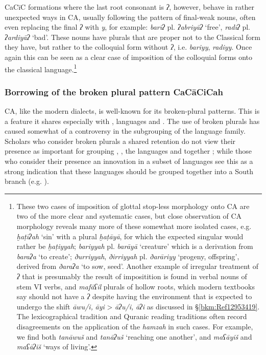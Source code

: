 \documentclass[output=paper]{langsci/langscibook}
\begin{document}
CaCīC formations where the last {root} consonant is \textit{ʔ}, however, behave in rather unexpected ways in CA, usually following the pattern of final-weak nouns, often even replacing the final \textit{ʔ} with \textit{y}, for example: \textit{barīʔ} pl. \textit{ʔabriyāʔ} ‘free’, \textit{radīʔ} pl. \textit{ʔardiyāʔ} ‘bad’. These nouns have plurals that are proper not to the Classical form they have, but rather to the colloquial form without \textit{ʔ}, i.e. \textit{bariyy}, \textit{radiyy}. Once again this can be seen as a clear case of {imposition} of the colloquial  forms onto the classical language.\footnote{These two cases of {imposition} of glottal stop-less morphology onto CA are two of the more clear and systematic cases, but close observation of CA morphology reveals many more of these somewhat more isolated cases, e.g. \textit{ḫaṭīʔah} ‘sin’ with a plural \textit{ḫaṭāyā}, for which the expected singular would rather be \textit{ḫaṭiyyah}; \textit{bariyyah} pl. \textit{barāyā} ‘creature’ which is a {derivation} from \textit{baraʔa} ‘to create’; \textit{ðurriyyah}, \textit{ðirriyyah} pl. \textit{ðarāriyy} ‘progeny, offspring’, derived from \textit{ðaraʔa} ‘to sow, seed’. Another example of irregular treatment of \textit{ʔ} that is presumably the result of impositition is found in verbal nouns of {stem} VI verbs, and \textit{mafāʕil} plurals of hollow {roots}, which modern textbooks say should not have a \textit{ʔ} despite having the environment that is expected to undergo the shift \textit{āwu/i,} \textit{āyi} > \textit{āʔu/i,} \textit{āʔi} as discussed in §\ref{bkm:Ref12953419}. The lexicographical tradition and Quranic reading traditions often record disagreements on the application of the \textit{hamzah} in such cases. For example, we find both \textit{tanāwuš} and \textit{tanāʔuš} ‘reaching one another’, and \textit{maʕāyiš} and \textit{maʕāʔiš} ‘ways of living’.}

\subsubsection{\label{bkm:Ref13224664}Borrowing of the broken plural pattern CaCāCiCah}

CA, like the modern  dialects, is well-known for its broken-plural patterns. This is a feature it shares especially with  \citep[1050--1051]{Stein2011},  languages \citep[1085]{Simeone-Senelle2011} and  \citep[1132]{Weninger2011OldEth}. The use of broken plurals has caused somewhat of a controversy in the subgrouping of the  language family. Scholars who consider broken plurals a shared retention do not view their presence as important for grouping , , the  languages and  together \citep[159--160]{Huehnergard2005}; while those who consider their presence an innovation in a subset of  languages see this as a strong indication that these languages should be grouped together into a South  branch (e.g. \citealt{Ratcliffe1998}).
\end{document}
